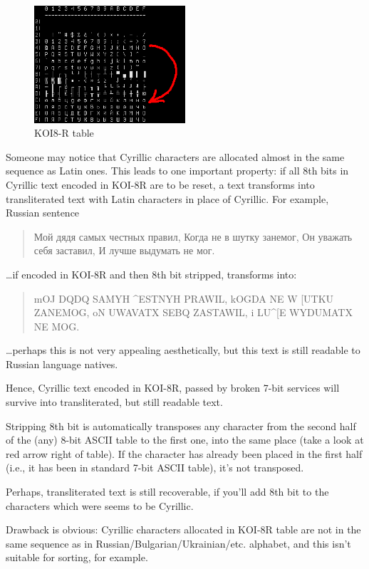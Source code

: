 \begin{figure}[H]
\centering
\includegraphics[width=0.5\textwidth]{fundamentals/koi8r.png}
\caption{KOI8-R table}
\end{figure}

Someone may notice that Cyrillic characters are allocated almost in the same sequence as Latin ones.
This leads to one important property: if all 8th bits in Cyrillic text encoded in KOI-8R are to be reset,
a text transforms into transliterated text with Latin characters in place of Cyrillic.
For example, Russian sentence

\begin{framed}
\begin{quotation}
Мой дядя самых честных правил, Когда не в шутку занемог, Он уважать себя заставил, И лучше выдумать не мог.
\end{quotation}
\end{framed}

\dots if encoded in KOI-8R and then 8th bit stripped, transforms into:

\begin{framed}
\begin{quotation}
mOJ DQDQ SAMYH \^{}ESTNYH PRAWIL, kOGDA NE W [UTKU ZANEMOG, oN UWAVATX SEBQ ZASTAWIL, i LU\^{}[E WYDUMATX NE MOG.
\end{quotation}
\end{framed}

\dots perhaps this is not very appealing aesthetically, but this text is still readable to Russian language natives.

Hence, Cyrillic text encoded in KOI-8R, passed by broken 7-bit services will survive into transliterated, but still
readable text.

Stripping 8th bit is automatically transposes any character from the second half of
the (any) 8-bit \ac{ASCII} table to the first one, into the same place (take a look at red arrow right of table).
If the character has already been placed in the first half (i.e., it has been in standard 7-bit \ac{ASCII} table), it's not transposed.

Perhaps, transliterated text is still recoverable, if you'll add 8th bit to the characters which were seems to be
Cyrillic.

Drawback is obvious: Cyrillic characters allocated in KOI-8R table are not in the same sequence as
in Russian/Bulgarian/Ukrainian/etc. alphabet, and this isn't suitable for sorting, for example.

